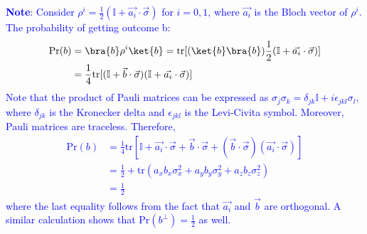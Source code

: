 \textcolor{blue}{\textbf{Note}: Consider $\rho^i = \frac{1}{2}(\mathbb{I} + \vec{a_i} \cdot \vec{\sigma})$ for $i=0,1$, 
where $\vec{a_i}$ is the Bloch vector of $\rho^i$. The probability of getting outcome b: 
\[
\begin{aligned}
    \text{Pr}(b) &= \bra{b} \rho^i \ket{b}  = \text{tr}[(\ket{b}\bra{b})\frac{1}{2}(\mathbb{I} + \vec{a_i} \cdot \vec{\sigma})] \\
    &= \frac{1}{4}\text{tr}[(\mathbb{I} + \vec{b} \cdot \vec{\sigma})(\mathbb{I} + \vec{a_i} \cdot \vec{\sigma})] \\
\end{aligned}
\]
Note that the product of Pauli matrices can be expressed as $\sigma_j \sigma_k = \delta_{jk} \mathbb{I} + i \epsilon_{jkl} \sigma_l$, 
where $\delta_{jk}$ is the Kronecker delta and $\epsilon_{jkl}$ is the Levi-Civita symbol. Moreover, Pauli matrices are traceless. Therefore,
\[ 
\begin{aligned}
    \text{Pr}(b) &= \frac{1}{4}\text{tr}[\mathbb{I} + \vec{a_i} \cdot \vec{\sigma} + \vec{b} \cdot \vec{\sigma} + (\vec{b} \cdot \vec{\sigma})(\vec{a_i} \cdot \vec{\sigma})] \\
    &= \frac{1}{2} + \text{tr}(a_xb_x \sigma_x^2 + a_yb_y \sigma_y^2 + a_zb_z \sigma_z^2) \\
    &= \frac{1}{2} 
\end{aligned}
\]
where the last equality follows from the fact that $\vec{a_i}$ and $\vec{b}$ are orthogonal. A similar calculation shows that $\text{Pr}(b^\bot) = \frac{1}{2}$ as well.
}



